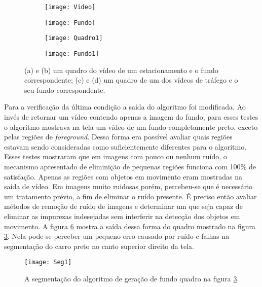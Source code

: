 \begin{figure}
 \centering
  \begin{subfigure}{.6\textwidth}
  \centering
  \texttt{[image: Video]}
  \caption{}
  \label{figTestesFundos:sfig1}
\end{subfigure}%
 \begin{subfigure}{.6\textwidth}
  \centering
  \texttt{[image: Fundo]}
  \caption{}
  \label{figTestesFundos:sfig2}
\end{subfigure}

\begin{subfigure}{.6\textwidth}
  \centering
  \texttt{[image: Quadro1]}
  \caption{}
  \label{figTestesFundos:sfig3}
\end{subfigure}%
\begin{subfigure}{.6\textwidth}
  \centering
  \texttt{[image: Fundo1]}
  \caption{}
  \label{figTestesFundos:sfig4}
\end{subfigure}


\caption{(a) e (b) um quadro do vídeo de um estacionamento e o fundo correspondente; (c) e (d) um quadro de um dos vídeos de tráfego e o seu fundo correspondente.}
\label{figTestesFundos}
\end{figure}


Para a verificação da última condição a saída do algoritmo foi modificada. Ao invés de retornar um vídeo contendo apenas a imagem do fundo, para esses testes o algoritmo mostrava na tela um vídeo de um fundo completamente preto, exceto pelas regiões de \textit{foreground}. Dessa forma era possível avaliar quais regiões estavam sendo consideradas como suficientemente diferentes para o algoritmo. Esses testes mostraram que em imagens com pouco ou nenhum ruído, o mecanismo apresentado de eliminição de pequenas regiões funciona com 100\% de satisfação. Apenas as regiões com objetos em movimento eram mostradas na saída de vídeo. Em imagens muito ruidosas porém, percebeu-se que é necessário um tratamento prévio, a fim de eliminar o ruído presente. É preciso então avaliar métodos de remoção de ruído de imagens e determinar um que seja capaz de eliminar as impurezas indesejadas sem interferir na detecção dos objetos em movimento. A figura \ref{testeSegmentacaoFig} mostra a saída dessa forma do quadro mostrado na figura \ref{figTestesFundos:sfig3}. Nela pode-se perceber um pequeno erro causado por ruído e falhas na segmentação do carro preto no canto superior direito da tela.

\begin{figure}
 \centering
  \texttt{[image: Seg1]}  
    \caption{A segmentação do algoritmo de geração de fundo quadro na figura \ref{figTestesFundos:sfig3}.}
\label{testeSegmentacaoFig}
\end{figure}

